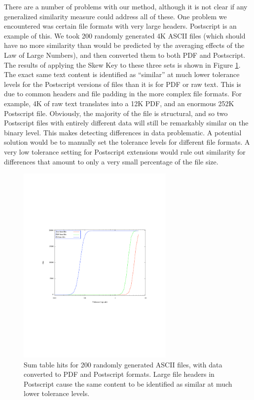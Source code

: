 \documentclass[10pt, twocolumn]{article}
\begin{document}
There are a number of problems with our method, although it is not clear if any  generalized similarity measure could address all of these.  One problem we encountered was certain file formats with very large headers.  Postscript is an example of this.  We took 200 randomly generated 4K ASCII files (which should have no more similarity than would be predicted by the averaging effects of the Law of Large Numbers), and then converted them to both PDF and Postscript.  The results of applying the Skew Key to these three sets is shown in Figure \ref{headerFiles}.  The exact same text content is identified as ``similar'' at much lower tolerance levels for the Postscript versions of files than it is for PDF or raw text.  This is due to common headers and file padding in the more complex file formats.  For example, 4K of raw text translates into a 12K PDF, and an enormous 252K Postscript file.  Obviously, the majority of the file is structural, and so two Postscript files with entirely different data will still be remarkably similar on the binary level.  This makes detecting differences in data problematic.  A potential solution would be to manually set the tolerance levels for different file formats.  A very low tolerance setting for Postscript extensions would rule out similarity for differences that amount to only a very small percentage of the file size.

 \begin{figure}[t] 
 \centering
\includegraphics[width= 3in]{fileFormats.pdf}
\caption{Sum table hits for 200 randomly generated ASCII files, with data converted to PDF and Postscript formats.  Large file headers in Postscript cause the same content to be identified as similar at much lower tolerance levels.}
\label{headerFiles}
\end{figure}
\end{document}
